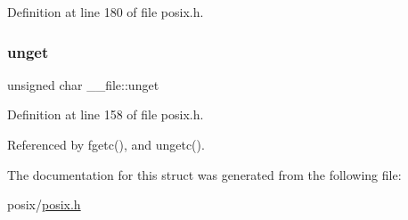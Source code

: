 Definition at line 180 of file posix.\+h.

\mbox{\label{struct____file_a1d139ae3cb11a1fada469a49f7d3d3b6}} 
\subsubsection{\texorpdfstring{unget}{unget}}
{\footnotesize\ttfamily unsigned char \+\_\+\+\_\+file\+::unget}



Definition at line 158 of file posix.\+h.



Referenced by fgetc(), and ungetc().



The documentation for this struct was generated from the following file\+:\begin{DoxyCompactItemize}
\item 
posix/\hyperlink{posix_8h}{posix.\+h}\end{DoxyCompactItemize}
